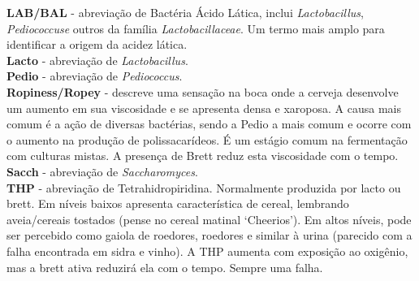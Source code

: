 \textbf{LAB/BAL} - abreviação de Bactéria Ácido Lática, inclui \textit{Lactobacillus}, \textit{Pediococcuse} outros da família \textit{Lactobacillaceae}. Um termo mais amplo para identificar a origem da acidez lática.\\
\textbf{Lacto} - abreviação de \textit{Lactobacillus}.\\
\textbf{Pedio} - abreviação de \textit{Pediococcus}.\\
\textbf{Ropiness/Ropey} - descreve uma sensação na boca onde a cerveja desenvolve um aumento em sua viscosidade e se apresenta densa e xaroposa. A causa mais comum é a ação de diversas bactérias, sendo a Pedio a mais comum e ocorre com o aumento na produção de polissacarídeos. É um estágio comum na fermentação com culturas mistas. A presença de Brett reduz esta viscosidade com o tempo.\\
\textbf{Sacch} - abreviação de \textit{Saccharomyces}.\\
\textbf{THP} - abreviação de Tetrahidropiridina. Normalmente produzida por lacto ou brett. Em níveis baixos apresenta característica de cereal, lembrando aveia/cereais tostados (pense no cereal matinal ‘Cheerios’). Em altos níveis, pode ser percebido como gaiola de roedores, roedores e similar à urina (parecido com a falha encontrada em sidra e vinho). A THP aumenta com exposição ao oxigênio, mas a brett ativa reduzirá ela com o tempo. Sempre uma falha.
